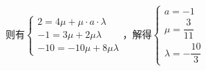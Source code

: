 \begin{enumerate}
\begin{jieda}
\begin{enumerate}
            则有$\left\{\begin{array}{l}
                 2 = 4\mu +\mu \cdot a \cdot \lambda \\
                 -1 = 3\mu + 2\mu\lambda \\
                 -10 = -10 \mu + 8 \mu \lambda
            \end{array}\right.$，解得$\left\{\begin{array}{l}
                 a = -1  \\
                 \mu = \dfrac{3}{11} \\
                 \lambda = -\dfrac{10}{3}
            \end{array}\right.$
        \end{enumerate}
    \end{jieda}
\end{enumerate}

